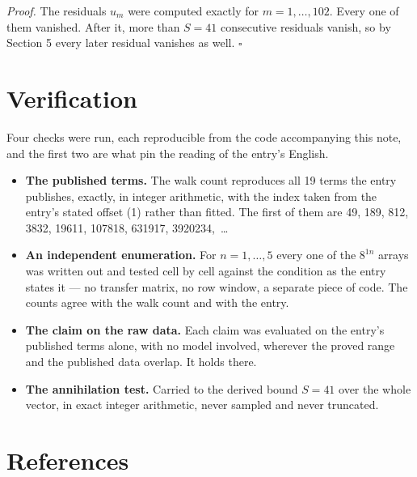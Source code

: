\documentclass[11pt]{article}
\theoremstyle{definition}
\begin{document}
{\itshape Proof.} The residuals $u_m$ were computed exactly for $m = 1,\dots,102$. Every one of them vanished. After it, more than $S = 41$ consecutive residuals vanish, so by Section 5 every later residual vanishes as well. $\square$

\section{Verification}

Four checks were run, each reproducible from the code accompanying this note, and the first two are what pin the reading of the entry's English.

\begin{itemize}

\item {\bfseries The published terms.} The walk count reproduces all 19 terms the entry publishes, exactly, in integer arithmetic, with the index taken from the entry's stated offset (1) rather than fitted. The first of them are 49, 189, 812, 3832, 19611, 107818, 631917, 3920234,~\dots

\item {\bfseries An independent enumeration.} For $n = 1,\dots,5$ every one of the $8^{1n}$ arrays was written out and tested cell by cell against the condition as the entry states it --- no transfer matrix, no row window, a separate piece of code. The counts agree with the walk count and with the entry.

\item {\bfseries The claim on the raw data.} Each claim was evaluated on the entry's published terms alone, with no model involved, wherever the proved range and the published data overlap. It holds there.

\item {\bfseries The annihilation test.} Carried to the derived bound $S = 41$ over the whole vector, in exact integer arithmetic, never sampled and never truncated.

\end{itemize}

\section{References}
\end{document}
